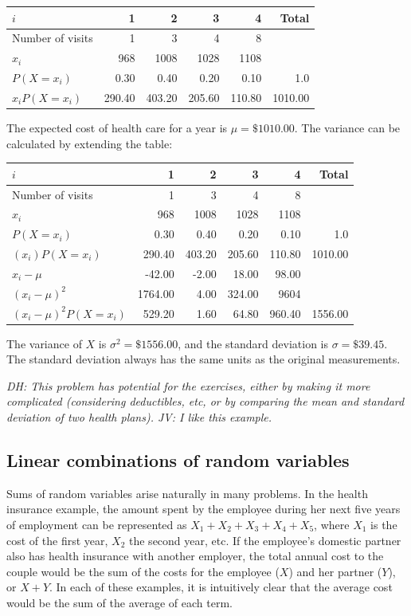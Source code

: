 \begin{example}
\begin{center}
\begin{tabular}{l rrrr r}
\hline
$i$ & 1 & 2 & 3 & 4 & Total \\
\hline
Number of visits & 1 & 3 & 4 & 8 &\\
$x_i$ & 968 & 1008 & 1028 & 1108 &  \\
$P(X=x_i)$ & 0.30 & 0.40 & 0.20 & 0.10 & 1.0 \\
$x_i P(X=x_i)$ & 290.40 & 403.20 & 205.60 & 110.80 & 1010.00 \\
\hline
\end{tabular}
\end{center}
The expected cost of health care for a year is $\mu=\$1010.00$. The variance can be calculated by extending the table:
\begin{center}
\begin{tabular}{l rrrr r}
\hline
$i$ & 1 & 2 & 3 & 4 & Total \\
\hline
Number of visits & 1 & 3 & 4 & 8 &\\
$x_i$ & 968 & 1008 & 1028 & 1108 &  \\
$P(X=x_i)$ & 0.30 & 0.40 & 0.20 & 0.10 & 1.0 \\
$(x_i)P(X=x_i)$ & 290.40 & 403.20 & 205.60 & 110.80 & 1010.00 \\
$x_i - \mu$ & -42.00  & -2.00  & 18.00  & 98.00 & \\
$(x_i - \mu)^2$ &  1764.00 & 4.00  & 324.00  & 9604 & \\
$(x_i - \mu)^2 P(X=x_i)$ & 529.20  & 1.60  & 64.80  & 960.40 & 1556.00\\
\hline
\end{tabular}
\end{center}
The variance of $X$ is $\sigma^2 = \$1556.00$, and the standard deviation is $\sigma = \$39.45$.  The standard deviation always has the same units as the original measurements. 

\end{example}

\textit{DH: This problem has potential for the exercises, either by making it more complicated (considering deductibles, etc, or by comparing the mean and standard deviation of two health plans). JV: I like this example.}

\subsection{Linear combinations of random variables}

Sums of random variables arise naturally in many problems. In the health insurance example, the amount spent by the employee during her next five years of employment can be represented as $X_1 + X_2 + X_3 + X_4 + X_5$, where $X_1$ is the cost of the first year, $X_2$ the second year, etc. If the employee's domestic partner also has health insurance with another employer, the total annual cost to the couple would be the sum of the costs for the employee ($X$) and her partner ($Y$), or $X + Y$. In each of these examples, it is intuitively clear that the average cost would be the sum of the average of each term.


